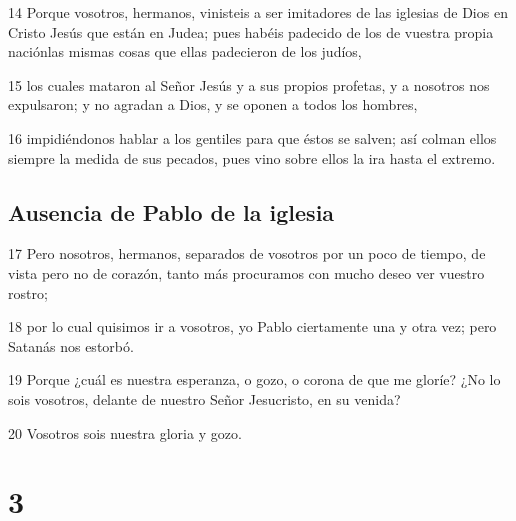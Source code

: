 \par 14 Porque vosotros, hermanos, vinisteis a ser imitadores de las iglesias de Dios en Cristo Jesús que están en Judea; pues habéis padecido de los de vuestra propia naciónlas mismas cosas que ellas padecieron de los judíos,
\par 15 los cuales mataron al Señor Jesús y a sus propios profetas, y a nosotros nos expulsaron; y no agradan a Dios, y se oponen a todos los hombres,
\par 16 impidiéndonos hablar a los gentiles para que éstos se salven; así colman ellos siempre la medida de sus pecados, pues vino sobre ellos la ira hasta el extremo.

\section*{Ausencia de Pablo de la iglesia}

\par 17 Pero nosotros, hermanos, separados de vosotros por un poco de tiempo, de vista pero no de corazón, tanto más procuramos con mucho deseo ver vuestro rostro;
\par 18 por lo cual quisimos ir a vosotros, yo Pablo ciertamente una y otra vez; pero Satanás nos estorbó.
\par 19 Porque ¿cuál es nuestra esperanza, o gozo, o corona de que me gloríe? ¿No lo sois vosotros, delante de nuestro Señor Jesucristo, en su venida?
\par 20 Vosotros sois nuestra gloria y gozo.

\chapter{3}

